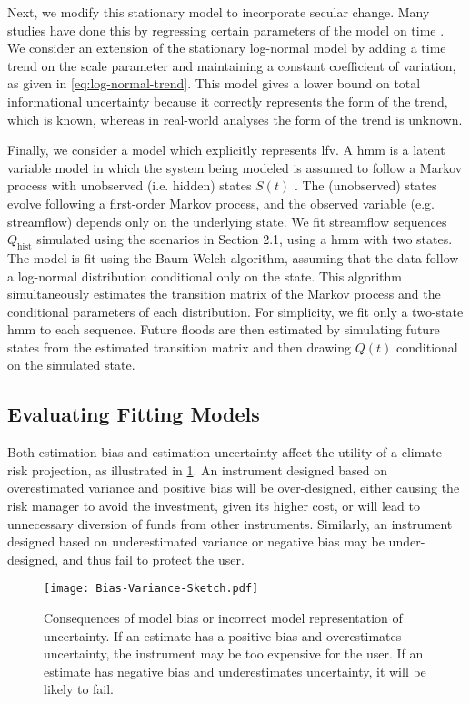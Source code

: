\documentclass[
  draft,
  linenumbers
]{agujournal2018}
\makeatletter
\newcommand{\eg}{e.g.\@\xspace}
\newcommand{\ie}{i.e.\@\xspace}
\makeatother
\begin{document}
Next, we modify this stationary model to incorporate secular change.
Many studies have done this by regressing certain parameters of the model on time \citep[see][for a comprehensive review]{Salas:2018ge}.
We consider an extension of the stationary log-normal model by adding a time trend on the scale parameter and maintaining a constant coefficient of variation, as given in \cref{eq:log-normal-trend}.
This model gives a lower bound on total informational uncertainty because it correctly represents the form of the trend, which is known, whereas in real-world analyses the form of the trend is unknown.

Finally, we consider a model which explicitly represents \acrlong{lfv}.
A \gls{hmm} is a latent variable model in which the system being modeled is assumed to follow a Markov process with unobserved (\ie hidden) states $S(t)$ \citep{Rabiner:1986jk}.
The (unobserved) states evolve following a first-order Markov process, and the observed variable (\eg streamflow) depends only on the underlying state.
We fit  streamflow sequences $Q_\text{hist}$ simulated using the scenarios in Section 2.1, using a \gls{hmm} with two states.
The model is fit using the Baum-Welch algorithm, assuming that the data follow a log-normal distribution conditional only on the state.
This algorithm simultaneously estimates the transition matrix of the Markov process and the conditional parameters of each distribution.
For simplicity, we fit only a two-state \gls{hmm} to each sequence.
Future floods are then estimated by simulating future states from the estimated transition matrix and then drawing $Q(t)$ conditional on the simulated state.

\subsection{Evaluating Fitting Models}\label{sec:methods-evaluating}

Both estimation bias and estimation uncertainty affect the utility of a climate risk projection, as illustrated in \cref{fig:conceptual-bias-variance}.
An instrument designed based on overestimated variance and positive bias will be over-designed, either causing the risk manager to avoid the investment, given its higher cost, or will lead to unnecessary diversion of funds from other instruments.
Similarly, an instrument designed based on underestimated variance or negative bias may be under-designed, and thus fail to protect the user.
\begin{figure}
  \centering
  \texttt{[image: Bias-Variance-Sketch.pdf]}
  \caption{
    Consequences of model bias or incorrect model representation of uncertainty.
    If an estimate has a positive bias and overestimates uncertainty, the instrument may be too expensive for the user.
    If an estimate has negative bias and underestimates uncertainty, it will be likely to fail.
  }\label{fig:conceptual-bias-variance}
\end{figure}
\end{document}
